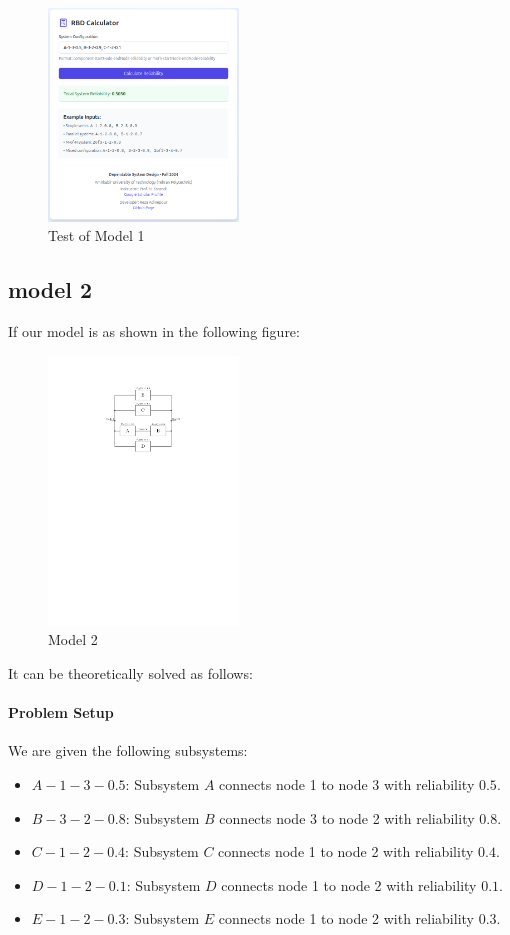 \documentclass[12pt	]{article}
\begin{document}
\begin{figure}[h]
	\centering
	\includegraphics[width=0.45\textwidth]{Images/img3.png}
	\caption{Test of Model 1}
	\label{fig:Test of Model 1}
\end{figure}



\subsection{model 2}
If our model is as shown in the following figure:

\begin{figure}[h]
	\centering
	\includegraphics[width=0.45\textwidth]{Images/img3.pdf}
	\caption{Model 2}
	\label{fig:Model 2}
\end{figure}

It can be theoretically solved as follows:

\paragraph{Problem Setup}
We are given the following subsystems:
\begin{itemize}
	\item $A-1-3-0.5$: Subsystem $A$ connects node 1 to node 3 with reliability $0.5$.
	\item $B-3-2-0.8$: Subsystem $B$ connects node 3 to node 2 with reliability $0.8$.
	\item $C-1-2-0.4$: Subsystem $C$ connects node 1 to node 2 with reliability $0.4$.
	\item $D-1-2-0.1$: Subsystem $D$ connects node 1 to node 2 with reliability $0.1$.
	\item $E-1-2-0.3$: Subsystem $E$ connects node 1 to node 2 with reliability $0.3$.
\end{itemize}
\end{document}
